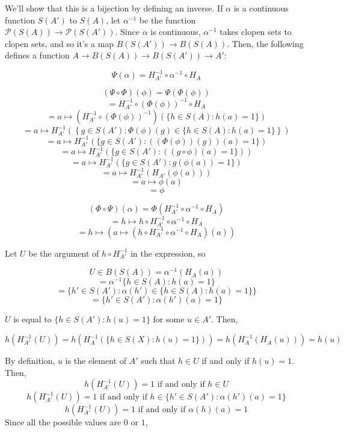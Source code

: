 \documentclass{article}
\begin{document}
      We'll show that this is a bijection by defining an inverse. If $\alpha$ is
      a continuous function $S(A')$ to $S(A)$, let $\alpha^{-1}$  be the
      function $\mathcal{P}(S(A)) \to \mathcal{P}(S(A'))$. Since $\alpha$ is
      continuous, $\alpha^{-1}$ takes clopen sets to clopen sets, and so it's a
      map $B(S(A')) \to B(S(A))$. Then, the following defines a function $A \to
      B(S(A)) \to B(S(A')) \to A'$:

      \[\Psi(\alpha) = H_{A'}^{-1} \circ \alpha^{-1} \circ H_A\]

      \[(\Psi \circ \Phi)(\phi) = \Psi(\Phi(\phi))\]
      \[ = H_{A'}^{-1} \circ (\Phi(\phi))^{-1} \circ H_A \]
      \[ = a \mapsto (H_{A'}^{-1} \circ (\Phi(\phi))^{-1}) \left(\{h \in S(A) :
      h(a) = 1 \}\right) \]
      \[ = a \mapsto H_{A'}^{-1} \left( \left\{g \in S(A') : \Phi(\phi)(g) \in
      \{h \in S(A) : h(a) = 1 \}\right\} \right) \]
      \[ = a \mapsto H_{A'}^{-1} (\{g \in S(A') : ((\Phi(\phi))(g))(a) = 1 \})\]
      \[ = a \mapsto H_{A'}^{-1} (\{g \in S(A') : ((g \circ \phi)(a) = 1 \})) \]
      \[ = a \mapsto H_{A'}^{-1} (\{g \in S(A') : g(\phi(a)) = 1 \}) \]
      \[ = a \mapsto H_{A'}^{-1} (H_{A'}(\phi(a))) \]
      \[ = a \mapsto \phi(a)\]
      \[ = \phi\]

      \[(\Phi \circ \Psi)(\alpha) = \Phi(H_{A'}^{-1} \circ \alpha^{-1} \circ
      H_A)\]
      \[= h \mapsto h \circ H_{A'}^{-1} \circ \alpha^{-1} \circ H_A \]
      \[= h \mapsto (a \mapsto (h \circ H_{A'}^{-1} \circ \alpha^{-1} \circ
      H_A)(a)) \]

      Let $U$ be the argument of $h \circ H_{A'}^{-1}$ in the expression, so

      \[U \in B(S(A)) = \alpha^{-1} (H_A (a))\]
      \[ = \alpha^{-1} \{h \in S(A) : h(a) = 1 \}\]
      \[ = \{h' \in S(A') :\alpha(h') \in \{ h \in S(A) : h(a) = 1\} \}\]
      \[ = \{h' \in S(A') : \alpha(h')(a) = 1\} \]


      $U$ is equal to $\{h \in S(A') : h(u) = 1\}$ for some $u \in A'$. Then,

      \[ h ( H_{A'}^{-1} (U)) =  h(H_A^{-1}(\{h \in S(X) : h(u) = 1\})) =
      h(H_A^{-1}(H_A(u))) = h(u)\]

      By definition, $u$ is the element of $A'$ such that $h \in U$ if and only
      if $h(u) = 1$. Then, \[ h ( H_{A'}^{-1} (U)) = 1 \text{ if and only if } h
      \in U\] \[ h ( H_{A'}^{-1} (U)) = 1 \text{ if and only if } h \in \{h'
      \in S(A') : \alpha(h')(a) = 1\} \] \[ h ( H_{A'}^{-1} (U)) = 1 \text{ if
      and only if } \alpha(h)(a) = 1\] Since all the possible values are $0$
      or $1$,
\end{document}
